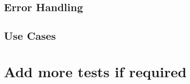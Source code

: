 \documentclass[11pt]{article}
\begin{document}
		\subsection{Error Handling}
			\paragraph{}
		\subsection{Use Cases}
			\paragraph{}
	\section{Add more tests if required}


	
	
\end{document}
